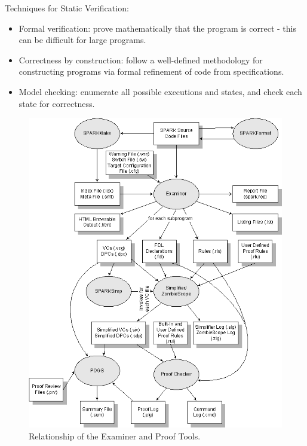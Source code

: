 Techniques for Static Verification:
\begin{itemize}
	\item Formal verification: prove mathematically that the program is correct - this can be difficult for large programs.
	\item Correctness by construction: follow a well-defined methodology for constructing programs via formal refinement of code from specifications.
	\item Model checking: enumerate all possible executions and states, and check each state for correctness.
\end{itemize}

\begin{figure}[ht]%
    \begin{center}
    	\includegraphics[height=0.6\textheight]{figures/spark-tools.png}    	
    \end{center}
    \caption{Relationship of the Examiner and Proof Tools.\protect\footnotemark}
    \label{figure:spark-tools}
\end{figure}

